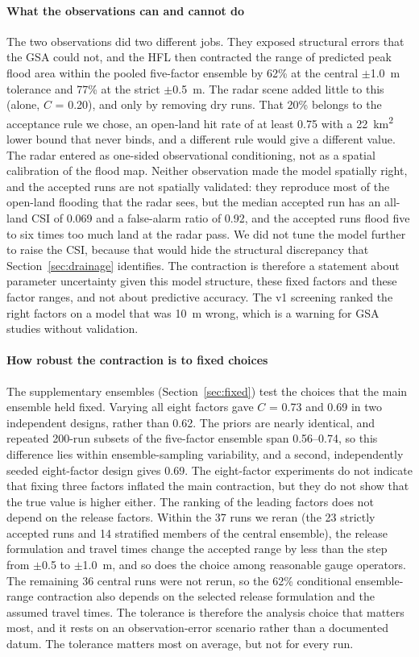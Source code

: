 \documentclass[preprint,12pt,authoryear]{elsarticle}
\newcommand{\kmsq}{km\textsuperscript{2}}
\begin{document}
\paragraph{What the observations can and cannot do}
The two observations did two different jobs. They exposed structural errors that the GSA could not, and the HFL then contracted the range of predicted peak flood area within the pooled five-factor ensemble by 62\% at the central $\pm$1.0~m tolerance and 77\% at the strict $\pm$0.5~m. The radar scene added little to this (alone, $C$ = 0.20), and only by removing dry runs. That 20\% belongs to the acceptance rule we chose, an open-land hit rate of at least 0.75 with a 22~\kmsq{} lower bound that never binds, and a different rule would give a different value. The radar entered as one-sided observational conditioning, not as a spatial calibration of the flood map. Neither observation made the model spatially right, and the accepted runs are not spatially validated: they reproduce most of the open-land flooding that the radar sees, but the median accepted run has an all-land CSI of 0.069 and a false-alarm ratio of 0.92, and the accepted runs flood five to six times too much land at the radar pass. We did not tune the model further to raise the CSI, because that would hide the structural discrepancy that Section~\ref{sec:drainage} identifies. The contraction is therefore a statement about parameter uncertainty given this model structure, these fixed factors and these factor ranges, and not about predictive accuracy. The v1 screening ranked the right factors on a model that was 10~m wrong, which is a warning for GSA studies without validation.

\paragraph{How robust the contraction is to fixed choices}
The supplementary ensembles (Section~\ref{sec:fixed}) test the choices that the main ensemble held fixed. Varying all eight factors gave $C$ = 0.73 and 0.69 in two independent designs, rather than 0.62. The priors are nearly identical, and repeated 200-run subsets of the five-factor ensemble span 0.56--0.74, so this difference lies within ensemble-sampling variability, and a second, independently seeded eight-factor design gives 0.69. The eight-factor experiments do not indicate that fixing three factors inflated the main contraction, but they do not show that the true value is higher either. The ranking of the leading factors does not depend on the release factors. Within the 37 runs we reran (the 23 strictly accepted runs and 14 stratified members of the central ensemble), the release formulation and travel times change the accepted range by less than the step from $\pm$0.5 to $\pm$1.0~m, and so does the choice among reasonable gauge operators. The remaining 36 central runs were not rerun, so the 62\% conditional ensemble-range contraction also depends on the selected release formulation and the assumed travel times. The tolerance is therefore the analysis choice that matters most, and it rests on an observation-error scenario rather than a documented datum. The tolerance matters most on average, but not for every run.
\end{document}
